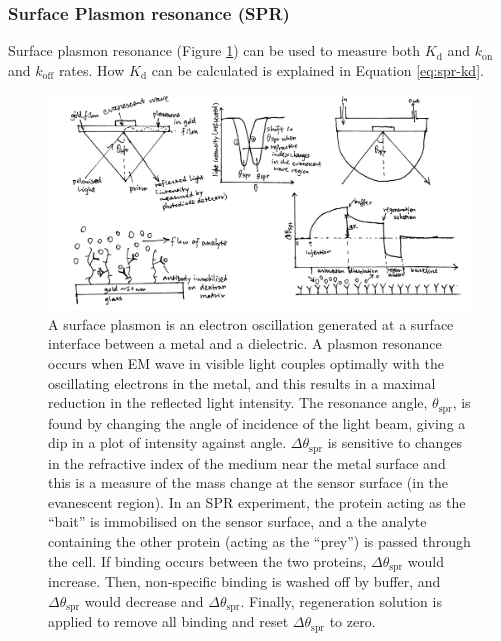 \documentclass[
]{article}
\begin{document}
\hypertarget{surface-plasmon-resonance-spr}{%
\subsubsection{Surface Plasmon resonance (SPR)}\label{surface-plasmon-resonance-spr}}

Surface plasmon resonance (Figure \ref{fig:spr}) can be used to measure both \(K_\text{d}\) and \(k_\text{on}\) and \(k_\text{off}\) rates. How \(K_\text{d}\) can be calculated is explained in Equation \eqref{eq:spr-kd}.



\begin{figure}
\includegraphics[width=1\linewidth]{../img/spr} \caption{A surface plasmon is an electron oscillation generated at a surface interface between a metal and a dielectric. A plasmon resonance occurs when EM wave in visible light couples optimally with the oscillating electrons in the metal, and this results in a maximal reduction in the reflected light intensity. The resonance angle, \(\theta_\text{spr}\), is found by changing the angle of incidence of the light beam, giving a dip in a plot of intensity against angle. \(\Delta\theta_\text{spr}\) is sensitive to changes in the refractive index of the medium near the metal surface and this is a measure of the mass change at the sensor surface (in the evanescent region). In an SPR experiment, the protein acting as the ``bait'' is immobilised on the sensor surface, and a the analyte containing the other protein (acting as the ``prey'') is passed through the cell. If binding occurs between the two proteins, \(\Delta\theta_\text{spr}\) would increase. Then, non-specific binding is washed off by buffer, and \(\Delta\theta_\text{spr}\) would decrease and \(\Delta\theta_\text{spr}\). Finally, regeneration solution is applied to remove all binding and reset \(\Delta\theta_\text{spr}\) to zero.}\label{fig:spr}
\end{figure}
\end{document}
